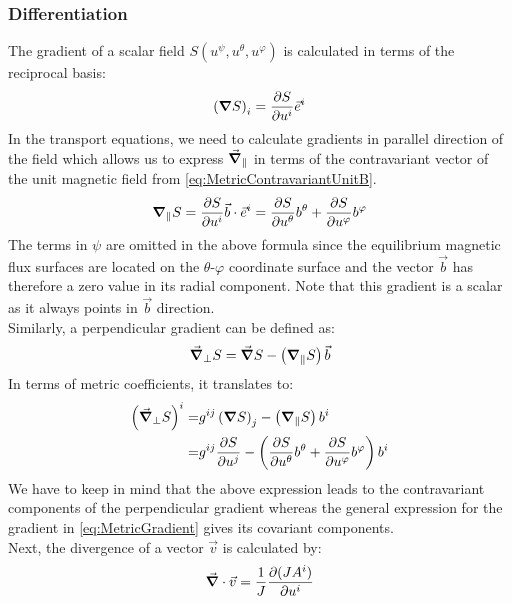 \subsubsection{Differentiation}
The gradient of a scalar field $S(u^\psi, u^\theta, u^\varphi)$ is calculated in terms of the reciprocal basis: 
\begin{align}
	\left(\grad{S}\right)_i = \pdv{S}{u^i}\vec{e}^i \label{eq:MetricGradient}
\end{align}
In the transport equations, we need to calculate gradients in parallel direction of the field which allows us to express $\vec{\grad}_\parallel$ in terms of the contravariant vector of the unit magnetic field from \autoref{eq:MetricContravariantUnitB}.
\begin{align}
	\grad_\parallel S = \pdv{S}{u^i}\vec{b}\cdot\vec{e}^i = \pdv{S}{u^\theta}b^\theta + \pdv{S}{u^\varphi}b^\varphi \label{eq:MetricParallelGradient}
\end{align}
The terms in $\psi$ are omitted in the above formula since the equilibrium magnetic flux surfaces are located on the $\theta$-$\varphi$ coordinate surface and the vector $\vec{b}$ has therefore a zero value in its radial component. Note that this gradient is a scalar as it always points in $\vec{b}$ direction. \\
Similarly, a perpendicular gradient can be defined as: 
\begin{equation*}
	\vec{\grad}_\perp S = \vec{\grad} S - \left(\grad_\parallel S\right)\vec{b}
\end{equation*}
In terms of metric coefficients, it translates to: 
\begin{align}
	\label{eq:MetricPerpendicularGradient}
	\left(\vec{\grad}_\perp S\right)^i =& g^{ij}\left(\grad{S}\right)_j - \left(\grad_\parallel S\right)b^i \nonumber \\
	=& g^{ij}\pdv{S}{u^j} - \left(\pdv{S}{u^\theta}b^\theta + \pdv{S}{u^\varphi}b^\varphi\right)b^i
\end{align}
We have to keep in mind that the above expression leads to the contravariant components of the perpendicular gradient whereas the general expression for the gradient in \autoref{eq:MetricGradient} gives its covariant components. \\

Next, the divergence of a vector $\vec{v}$ is calculated by: 
\begin{align}
	\vec{\grad}\cdot\vec{v} = \frac{1}{J}\pdv{(JA^i)}{u^i} \label{eq:MetricDivergence}
\end{align}


